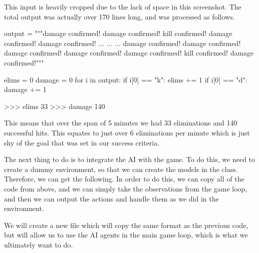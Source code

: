 This input is heavily cropped due to the lack of space in this screenshot. The total output was actually over 170 lines long, and was processed as follows.

\begin{mpy}
output = """damage confirmed!
damage confirmed!
kill confirmed!
damage confirmed!
damage confirmed!
...
...
...
damage confirmed!
damage confirmed!
damage confirmed!
damage confirmed!
damage confirmed!
kill confirmed!
damage confirmed!"""

elims = 0
damage = 0
for i in output:
    if i[0] == "k":
        elims += 1
    if i[0] == "d":
        damage += 1

>>> elims
33
>>> damage
140
\end{mpy}

This means that over the span of 5 minutes we had 33 eliminations and 140 successful hits. This equates to just over 6 eliminations per minute which is just shy of the goal that was set in our success criteria.

The next thing to do is to integrate the AI with the game. To do this, we need to create a dummy environment, so that we can create the models in the  class. Therefore, we can get the following. In order to do this, we can copy all of the code from above, and we can simply take the observations from the game loop, and then we can output the actions and handle them as we did in the environment.

\vs
We will create a new file which will copy the same format as the previous code, but will allow us to use the AI agents in the main game loop, which is what we ultimately want to do.

